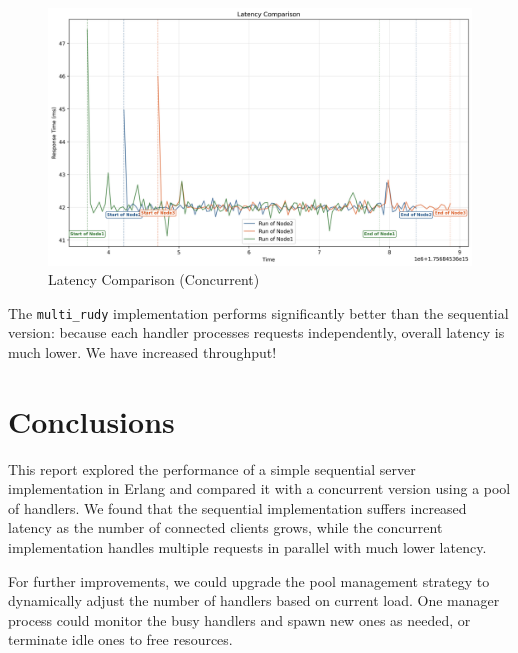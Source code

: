 \documentclass[a4paper, 11pt]{article}
\begin{document}
\begin{figure}[H]
  \centering
  \includegraphics[width=0.9\linewidth]{concurrent_benches/latency_plot.png}
  \caption{Latency Comparison (Concurrent)}
  \label{fig:latency_comparison_conc}
\end{figure}
\FloatBarrier

The \texttt{multi\_rudy} implementation performs significantly better than the sequential version: because each handler processes requests independently, overall latency is much lower. We have increased throughput!


\section{Conclusions}

This report explored the performance of a simple sequential server implementation in Erlang and compared it with a concurrent version using a pool of handlers. We found that the sequential implementation suffers increased latency as the number of connected clients grows, while the concurrent implementation handles multiple requests in parallel with much lower latency.

For further improvements, we could upgrade the pool management strategy to dynamically adjust the number of handlers based on current load. One manager process could monitor the busy handlers and spawn new ones as needed, or terminate idle ones to free resources.
\end{document}
